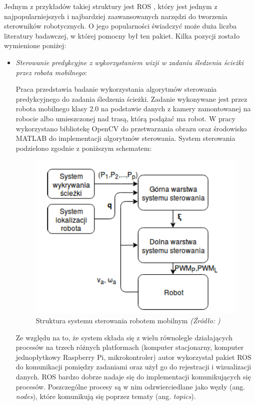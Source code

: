 \documentclass[a4paper, 12pt, twoside]{article}
\begin{document}
Jednym z przykładów takiej struktury jest ROS \cite{rosdesc}, który jest jednym z najpopularniejszych i najbardziej zaawansowanych narzędzi do tworzenia sterowników robotycznych. O jego popularności świadczyć może duża liczba literatury badawczej, w której pomocny był ten pakiet. Kilka pozycji zostało wymienione poniżej:

\begin{itemize}
\item \textit{Sterowanie predykcyjne z wykorzystaniem wizji w zadaniu śledzenia ścieżki przez robota mobilnego\cite{thesismeyer}}: 

Praca przedstawia badanie wykorzystania algorytmów sterowania predykcyjnego do zadania śledzenia ścieżki. Zadanie wykonywane jest przez robota mobilnego klasy 2.0 na podstawie danych z kamery zamontowanej na robocie albo umieszczonej nad trasą, którą podążać ma robot. W pracy wykorzystano bibliotekę OpenCV do przetwarzania obrazu oraz środowisko MATLAB do implementacji algorytmów sterowania. System sterowania podzielono zgodnie z poniższym schematem:

\begin{figure}[hbt!]
\centering
\includegraphics[width=0.8\linewidth]{images/mobile_robot_system.png}
\caption{Struktura systemu sterowania robotem mobilnym\textit{ (Źródło: \cite{thesismeyer}) } }
\label{fig:mobile_robot_scheme}
\end{figure}

Ze względu na to, że system składa się z wielu równolegle działających procesów na trzech różnych platformach (komputer stacjonarny, komputer jednopłytkowy Raspberry Pi, mikrokontroler) autor wykorzystał pakiet ROS do komunikacji pomiędzy zadaniami oraz użył go do rejestracji i wizualizacji danych. ROS bardzo dobrze nadaje się do implementacji komunikujących się procesów. Poszczególne procesy są w nim odzwierciedlane jako węzły (ang. \textit{nodes}), które komunikują się poprzez tematy (ang. \textit{topics}).


\end{itemize}
\end{document}
